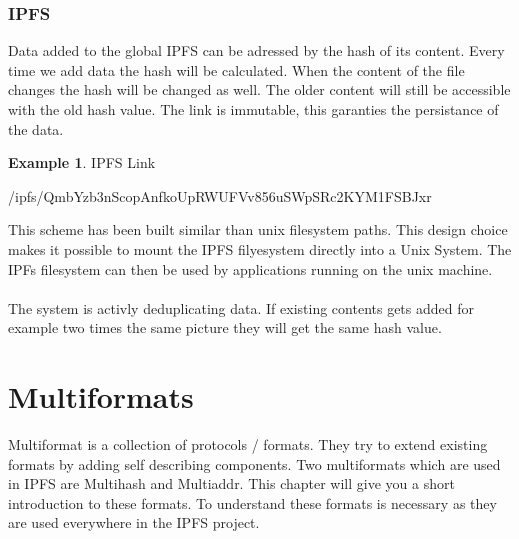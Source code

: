 \documentclass[a4paper,11pt, oneside]{report}
\theoremstyle{definition}
\newtheorem{exmp}{Example}[subsection]
\begin{document}
\subsection{IPFS}
Data added to the global IPFS can be adressed by the hash of its content. Every time we add data the hash will be calculated. When the content of the file changes the hash will be changed as well.  The older content will still be accessible with the old hash value. The link is immutable, this garanties the persistance of the data.
\begin{exmp} IPFS Link
\begin{center}
	/ipfs/QmbYzb3nScopAnfkoUpRWUFVv856uSWpSRc2KYM1FSBJxr
\end{center}
This scheme has been built similar than unix filesystem paths. This design choice makes it possible to mount the IPFS filyesystem directly into a Unix System. The IPFs filesystem can then be used by applications running on the unix machine.\\ \\
The system is activly deduplicating data. If existing contents gets added for example two times the same picture they will get the same hash value.
\end{exmp}



\chapter{Multiformats}

Multiformat is a collection of protocols / formats. They try to extend existing formats by adding self describing components.  Two multiformats which are used in IPFS are Multihash and Multiaddr. This chapter will give you a short introduction to these formats. To understand these formats is necessary as they are used everywhere in the IPFS project.
\end{document}
